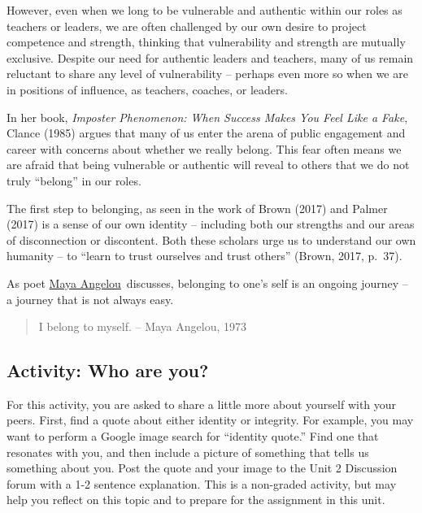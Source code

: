 \documentclass[
]{book}
\begin{document}
However, even when we long to be vulnerable and authentic within our roles as teachers or leaders, we are often challenged by our own desire to project competence and strength, thinking that vulnerability and strength are mutually exclusive. Despite our need for authentic leaders and teachers, many of us remain reluctant to share any level of vulnerability -- perhaps even more so when we are in positions of influence, as teachers, coaches, or leaders.

In her book, \emph{Imposter Phenomenon: When Success Makes You Feel Like a Fake}, Clance (1985) argues that many of us enter the arena of public engagement and career with concerns about whether we really belong. This fear often means we are afraid that being vulnerable or authentic will reveal to others that we do not truly ``belong'' in our roles.

The first step to belonging, as seen in the work of Brown (2017) and Palmer (2017) is a sense of our own identity -- including both our strengths and our areas of disconnection or discontent. Both these scholars urge us to understand our own humanity -- to ``learn to trust ourselves and trust others'' (Brown, 2017, p.~37).

As poet \href{http://billmoyers.com/content/conversation-maya-angelou/}{Maya Angelou}~discusses, belonging to one's self is an ongoing journey -- a journey that is not always easy.

\begin{quote}
I belong to myself. -- Maya Angelou, 1973
\end{quote}

\hypertarget{activity-who-are-you}{%
\subsection*{Activity: Who are you?}\label{activity-who-are-you}}

\begin{reflect}
For this activity, you are asked to share a little more about yourself with your peers. First, find a quote about either identity or integrity. For example, you may want to perform a Google image search for ``identity quote.'' Find one that resonates with you, and then include a picture of something that tells us something about you. Post the quote and your image to the Unit 2 Discussion forum with a 1-2 sentence explanation. This is a non-graded activity, but may help you reflect on this topic and to prepare for the assignment in this unit.
\end{reflect}
\end{document}
